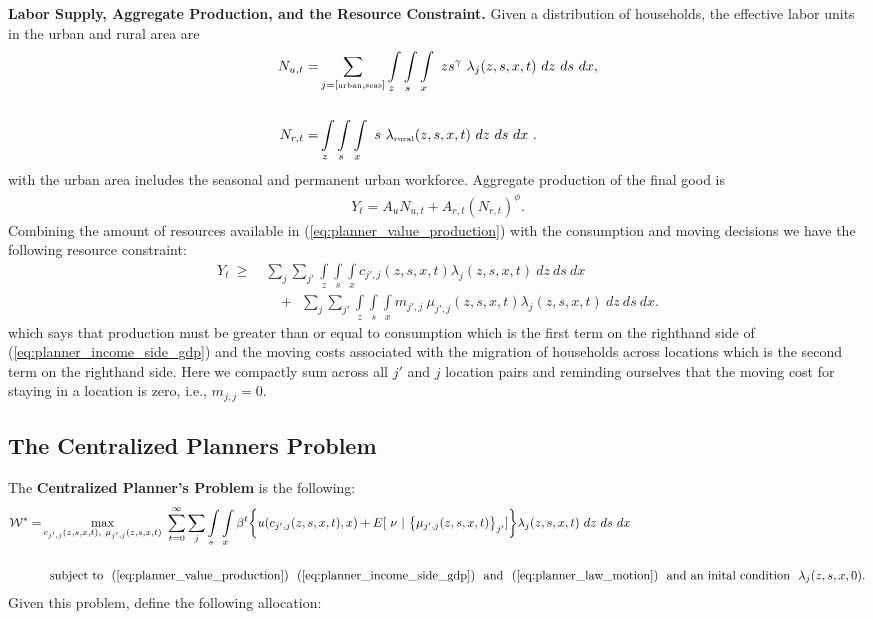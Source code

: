 \documentclass[12pt,pdftex]{article}
\begin{document}
\begin{onehalfspacing}
\textbf{Labor Supply, Aggregate Production, and the Resource Constraint.} Given a distribution of households, the effective labor units in the urban and rural area are
\begin{align}
N_{u,t} =& \sum_{j = [\mbox{\tiny urban}, \mbox{\tiny seas}]}\int\limits_{z} \int\limits_{s} \int\limits_{x} \  z s^{\gamma} \ \lambda_j(z, s, x, t) \ dz \ ds \ dx, \nonumber
\\
\nonumber \\
N_{r,t} =& \int\limits_{z} \int\limits_{s} \int\limits_{x} \ s \ \lambda_{\mbox{\tiny rural}}(z, s, x, t)\ dz \ ds \ dx \ .
\label{eq:planner_labor_supply}
\end{align}
with the urban area includes the seasonal and permanent urban workforce. Aggregate production of the final good is
\begin{align}
Y_t = A_u N_{u,t} + A_{r,t} \left(N_{r,t} \right)^{\phi}.
\label{eq:planner_value_production}
\end{align}
Combining the amount of resources available in (\ref{eq:planner_value_production}) with the consumption and moving decisions we have the following resource constraint:
\begin{align}
Y_t\  \geq \ & \sum_{j}\sum_{j'} \int\limits_{z} \int\limits_{s} \int\limits_{x} c_{j',j}(z, s, x, t) \lambda_{j}(z, s, x, t) \ dz \ ds \ dx  \nonumber \\
& \ \ \ \ +  \ \  \sum_{j}\sum_{j'} \int\limits_{z} \int\limits_{s} \int\limits_{x}  m_{j',j} \ \mu_{j',j}(z,s, x, t) \lambda_{j}(z, s, x, t) \ dz \ ds \ dx.
\label{eq:planner_income_side_gdp}
\end{align}
which says that production must be greater than or equal to consumption which is the first term on the righthand side of (\ref{eq:planner_income_side_gdp}) and the moving costs associated with the migration of households across locations which is the second term on the righthand side. Here we compactly sum across all $j'$ and $j$ location pairs and reminding ourselves that the moving cost for staying in a location is zero, i.e., $m_{j,j} = 0$.

\subsection{The Centralized Planners Problem}

The \textbf{Centralized Planner's Problem} is the following:
{\small
\begin{align}
\mathcal{W}^{*} = & \max\limits_{c_{j',j}(z, s, x, t),\ \mu_{j',j}(z, s, x, t)} \ \sum_{t=0}^{\infty}\sum_{j} \int\limits_{s} \int\limits_{x} \beta^{t} \bigg \{ u(c_{j',j}(z, s, x, t), x) + E[ \ \nu \ | \ \big\{\mu_{j',j}(z,s,x,t)\big\}_{j'}]  \bigg \} \lambda_{j}(z, s, x, t) \ dz \ ds \ dx \ \ \nonumber \\
\nonumber \\
& \ \ \mbox{subject to} \ \ (\ref{eq:planner_value_production}) \ \ (\ref{eq:planner_income_side_gdp}) \ \ \mbox{and} \ \ (\ref{eq:planner_law_motion}) \ \ \mbox{and an inital condition} \ \ \lambda_j(z, s, x,0).
\label{eq:planner_problem}
\end{align}}
Given this problem, define the following allocation:


\end{onehalfspacing}
\end{document}
